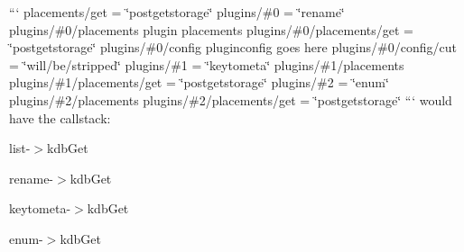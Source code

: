 ``` placements/get = \char`\"{}postgetstorage\char`\"{} plugins/\#0 = \char`\"{}rename\char`\"{} plugins/\#0/placements plugin placements plugins/\#0/placements/get = \char`\"{}postgetstorage\char`\"{} plugins/\#0/config pluginconfig goes here plugins/\#0/config/cut = \char`\"{}will/be/stripped\char`\"{} plugins/\#1 = \char`\"{}keytometa\char`\"{} plugins/\#1/placements plugins/\#1/placements/get = \char`\"{}postgetstorage\char`\"{} plugins/\#2 = \char`\"{}enum\char`\"{} plugins/\#2/placements plugins/\#2/placements/get = \char`\"{}postgetstorage\char`\"{} ``` would have the callstack\+:


\begin{DoxyEnumerate}
\item list-\/$>$kdb\+Get
\begin{DoxyEnumerate}
\item rename-\/$>$kdb\+Get
\item keytometa-\/$>$kdb\+Get
\item enum-\/$>$kdb\+Get 
\end{DoxyEnumerate}
\end{DoxyEnumerate}